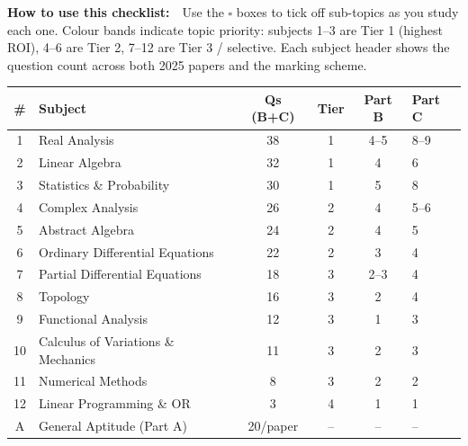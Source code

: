 \documentclass[11pt,a4paper]{article}
\begin{document}
\pagecolor{white}\color{black}
\newpage

\begin{tcolorbox}[enhanced, colback=C1!7, colframe=C1,
  boxrule=0.7pt, arc=5pt, left=10pt, right=10pt, top=8pt, bottom=8pt]
\textbf{\color{C1}How to use this checklist:}\ \
Use the $\square$ boxes to tick off sub-topics as you study each one.
Colour bands indicate topic priority: subjects 1--3 are Tier 1 (highest ROI), 4--6 are Tier 2, 7--12 are Tier 3 / selective.
Each subject header shows the question count across both 2025 papers and the marking scheme.
\end{tcolorbox}

\vspace{6pt}

\begin{center}
{\small
\begin{tabular}{@{}clcccl@{}}
\toprule
\rowcolor{C1!12}
\textbf{\#} & \textbf{Subject} & \textbf{Qs (B+C)} & \textbf{Tier} & \textbf{Part B} & \textbf{Part C} \\
\midrule
1 & Real Analysis              & 38 & 1 & 4--5 & 8--9 \\
2 & Linear Algebra             & 32 & 1 & 4   & 6   \\
3 & Statistics \& Probability  & 30 & 1 & 5   & 8   \\
4 & Complex Analysis           & 26 & 2 & 4   & 5--6 \\
5 & Abstract Algebra           & 24 & 2 & 4   & 5   \\
6 & Ordinary Differential Equations & 22 & 2 & 3 & 4 \\
7 & Partial Differential Equations  & 18 & 3 & 2--3 & 4 \\
8 & Topology                   & 16 & 3 & 2   & 4   \\
9 & Functional Analysis        & 12 & 3 & 1   & 3   \\
10 & Calculus of Variations \& Mechanics & 11 & 3 & 2 & 3 \\
11 & Numerical Methods          & 8  & 3 & 2   & 2   \\
12 & Linear Programming \& OR   & 3  & 4 & 1   & 1   \\
\midrule
A & General Aptitude (Part A)  & 20/paper & -- & -- & -- \\
\bottomrule
\end{tabular}}
\end{center}
\end{document}
